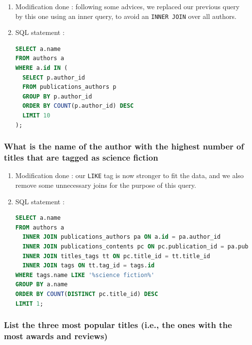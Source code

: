 \documentclass[doubleside, titlepage]{article}
\begin{document}
		\begin{enumerate}
	\item Modification done : following some advices, we replaced our previous query by this one using an inner query, to avoid an \texttt{INNER JOIN} over all authors.
	\item SQL statement :
		\begin{lstlisting}[language=SQL,showspaces=false,basicstyle=\ttfamily,numberstyle=\tiny,commentstyle=\color{gray}]
SELECT a.name
FROM authors a
WHERE a.id IN (
  SELECT p.author_id
  FROM publications_authors p
  GROUP BY p.author_id
  ORDER BY COUNT(p.author_id) DESC
  LIMIT 10
);
		\end{lstlisting}

\end{enumerate}

\subsubsection{What is the name of the author with the highest number of titles that are tagged as science fiction}

	\begin{enumerate}
	\item Modification done : our \texttt{LIKE} tag is now stronger to fit the data, and we also remove some unnecessary joins for the purpose of this query.
	\item SQL statement :
		\begin{lstlisting}[language=SQL,showspaces=false,basicstyle=\ttfamily,numberstyle=\tiny,commentstyle=\color{gray}]
SELECT a.name
FROM authors a
  INNER JOIN publications_authors pa ON a.id = pa.author_id
  INNER JOIN publications_contents pc ON pc.publication_id = pa.publication_id
  INNER JOIN titles_tags tt ON pc.title_id = tt.title_id
  INNER JOIN tags ON tt.tag_id = tags.id
WHERE tags.name LIKE '%science fiction%'
GROUP BY a.name
ORDER BY COUNT(DISTINCT pc.title_id) DESC
LIMIT 1;
		\end{lstlisting}

\end{enumerate}

\newpage

\subsubsection{List the three most popular titles (i.e., the ones with the most awards and reviews)}
\end{document}
